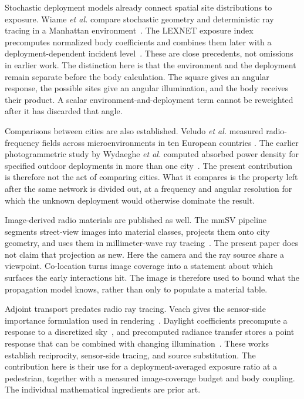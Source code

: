 \documentclass[journal]{IEEEtran}
\begin{document}
Stochastic deployment models already connect spatial site distributions to
exposure. Wiame \emph{et al.} compare stochastic geometry and deterministic ray
tracing in a Manhattan environment~\cite{wiame}. The LEXNET exposure index
precomputes normalized body coefficients and combines them later with a
deployment-dependent incident level~\cite{varsier}. These are close precedents,
not omissions in earlier work. The distinction here is that the environment and
the deployment remain separate before the body calculation. The square gives
an angular response, the possible sites give an angular illumination, and the
body receives their product. A scalar environment-and-deployment term cannot be
reweighted after it has discarded that angle.

Comparisons between cities are also established. Veludo \emph{et al.} measured
radio-frequency fields across microenvironments in ten European countries
\cite{veludo}. The earlier photogrammetric study by Wydaeghe \emph{et al.}
computed absorbed power density for specified outdoor deployments in more than
one city~\cite{wydaeghe2026}. The present contribution is therefore not the act
of comparing cities. What it compares is the property left after the same
network is divided out, at a frequency and angular resolution for which the
unknown deployment would otherwise dominate the result.

Image-derived radio materials are published as well. The mmSV pipeline segments
street-view images into material classes, projects them onto city geometry, and
uses them in millimeter-wave ray tracing~\cite{mmsv}. The present paper does not
claim that projection as new. Here the camera and the ray source share a
viewpoint. Co-location turns image coverage into a statement about which
surfaces the early interactions hit. The image is therefore used to bound what
the propagation model knows, rather than only to populate a material table.

Adjoint transport predates radio ray tracing. Veach gives the sensor-side
importance formulation used in rendering~\cite{veach}. Daylight coefficients
precompute a response to a discretized sky~\cite{tregenza}, and precomputed
radiance transfer stores a point response that can be combined with changing
illumination~\cite{sloan}. These works establish reciprocity, sensor-side
tracing, and source substitution. The contribution here is their use for a
deployment-averaged exposure ratio at a pedestrian, together with a measured
image-coverage budget and body coupling. The individual mathematical ingredients
are prior art.
\end{document}
